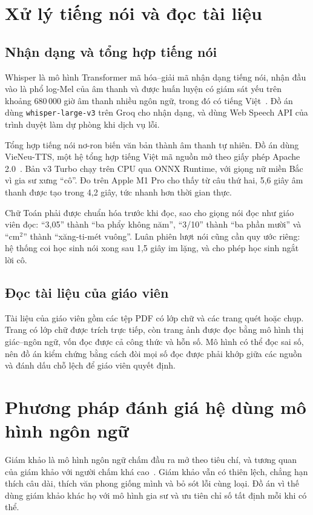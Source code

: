 \section{Xử lý tiếng nói và đọc tài liệu}

\subsection{Nhận dạng và tổng hợp tiếng nói}
Whisper là mô hình Transformer mã hóa--giải mã nhận dạng tiếng nói, nhận đầu vào là phổ log-Mel của âm thanh và được huấn luyện có giám sát yếu trên khoảng 680\,000 giờ âm thanh nhiều ngôn ngữ, trong đó có tiếng Việt~\cite{radford2023}. Đồ án dùng \texttt{whisper-large-v3} trên Groq cho nhận dạng, và dùng Web Speech API của trình duyệt làm dự phòng khi dịch vụ lỗi.

Tổng hợp tiếng nói nơ-ron biến văn bản thành âm thanh tự nhiên. Đồ án dùng VieNeu-TTS, một hệ tổng hợp tiếng Việt mã nguồn mở theo giấy phép Apache 2.0~\cite{vieneu}. Bản v3 Turbo chạy trên CPU qua ONNX Runtime, với giọng nữ miền Bắc vì gia sư xưng ``cô''. Đo trên Apple M1 Pro cho thấy từ câu thứ hai, 5,6 giây âm thanh được tạo trong 4,2 giây, tức nhanh hơn thời gian thực.

Chữ Toán phải được chuẩn hóa trước khi đọc, sao cho giọng nói đọc như giáo viên đọc: ``3,05'' thành ``ba phẩy không năm'', ``3/10'' thành ``ba phần mười'' và ``cm$^2$'' thành ``xăng-ti-mét vuông''. Luân phiên lượt nói cũng cần quy ước riêng: hệ thống coi học sinh nói xong sau 1,5 giây im lặng, và cho phép học sinh ngắt lời cô.

\subsection{Đọc tài liệu của giáo viên}
Tài liệu của giáo viên gồm các tệp PDF có lớp chữ và các trang quét hoặc chụp. Trang có lớp chữ được trích trực tiếp, còn trang ảnh được đọc bằng mô hình thị giác--ngôn ngữ, vốn đọc được cả công thức và hỗn số. Mô hình có thể đọc sai số, nên đồ án kiểm chứng bằng cách đòi mọi số đọc được phải khớp giữa các nguồn và đánh dấu chỗ lệch để giáo viên quyết định.

\section{Phương pháp đánh giá hệ dùng mô hình ngôn ngữ}

Giám khảo là mô hình ngôn ngữ chấm đầu ra mở theo tiêu chí, và tương quan của giám khảo với người chấm khá cao~\cite{zheng2023}. Giám khảo vẫn có thiên lệch, chẳng hạn thích câu dài, thích văn phong giống mình và bỏ sót lỗi cùng loại. Đồ án vì thế dùng giám khảo khác họ với mô hình gia sư và ưu tiên chỉ số tất định mỗi khi có thể.

